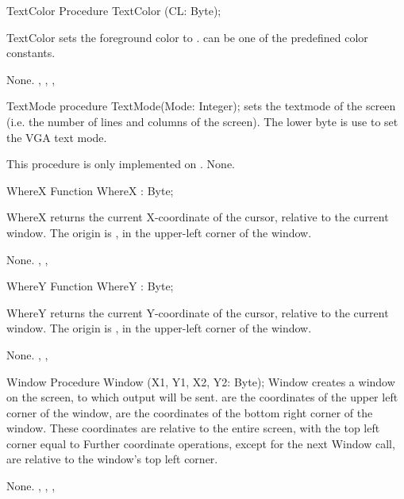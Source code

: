  
\begin{procedure}{TextColor}
\Declaration
Procedure TextColor (CL: Byte);
\Description

TextColor sets the foreground color to .  can be one of the
predefined color constants.

\Errors
None.
\SeeAlso
 , , ,
\end{procedure}


\begin{procedure}{TextMode}
\Declaration
procedure TextMode(Mode: Integer);
\Description
{} sets the textmode of the screen (i.e. the number of lines
and columns of the screen). The lower byte is use to set the VGA text mode.

This procedure is only implemented on \dos.
\Errors
None.
\SeeAlso
{}
\end{procedure}
 
\begin{function}{WhereX}
\Declaration
Function WhereX  : Byte;
\Description

WhereX returns the current X-coordinate of the cursor, relative to the
current window. The origin is , in the upper-left corner of the
window.

\Errors
None.
\SeeAlso
 , ,  
\end{function}

 
\begin{function}{WhereY}
\Declaration
Function WhereY  : Byte;
\Description

WhereY returns the current Y-coordinate of the cursor, relative to the
current window. The origin is , in the upper-left corner of the
window.

\Errors
None.
\SeeAlso
 , ,  
\end{function}

 
\begin{procedure}{Window}
\Declaration
Procedure Window (X1, Y1, X2, Y2: Byte);
\Description
 Window creates a window on the screen, to which output will be sent.
 are the coordinates of the upper left corner of the window,
 are the coordinates of the bottom right corner of the window.
These coordinates are relative to the entire screen, with the top left
corner equal to 
Further coordinate operations, except for the next Window call,
are relative to the window's top left corner.

\Errors
None.
\SeeAlso
{}, , , 
\end{procedure}



